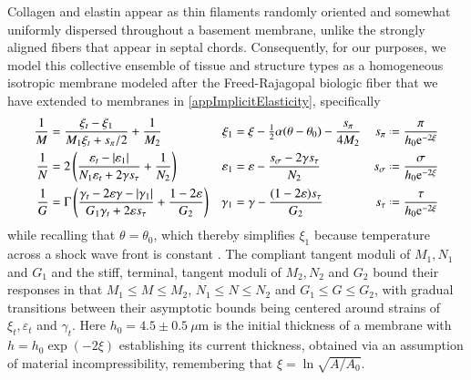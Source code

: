 Collagen and elastin appear as thin filaments randomly oriented and somewhat uniformly dispersed throughout a basement membrane, unlike the strongly aligned fibers that appear in septal chords.  Consequently, for our purposes, we model this collective ensemble of tissue and structure types as a homo\-geneous isotropic membrane modeled after the Freed-Rajagopal biologic fiber \cite{FreedRajagopal16} that we have extended to membranes in \ref{appImplicitElasticity}, specifically
\begin{subequations}
    \label{septalCompliances}
    \begin{align}
    \frac{1}{M} & = \frac{\xi_t - \xi_1}{M_1 \xi_t + s_{\pi} / 2} + \frac{1}{M_2} &
    \xi_1 & = \xi - \tfrac{1}{2} \alpha ( \theta - \theta_0 ) - \frac{s_{\pi}}{4M_2} & s_{\pi} & \defeq \frac{\pi}{h_0 \mathrm{e}^{-2\xi}}
    \label{septalDilationCompliance} \\
    \frac{1}{N} & = 2 \left( \frac{ \varepsilon_t - | \varepsilon_1 |}{N_1 \varepsilon_t + 2 \gamma s_{\tau}} + \frac{1}{N_2} \right) & 
    \varepsilon_1 & = \varepsilon - \frac{s_{\sigma} - 2 \gamma s_{\tau}}{N_2} & s_{\sigma} & \defeq \frac{\sigma}{h_0 \mathrm{e}^{-2\xi}}
    \label{septalSqueezeCompliance} \\
    \frac{1}{G} & = \Gamma \left( \frac{\gamma_t - 2\varepsilon \gamma - | \gamma_1 |}{G_1 \gamma_t + 2 \varepsilon s_{\tau}} + \frac{1-2\varepsilon}{G_2} \right) & 
    \gamma_1 & = \gamma - \frac{(1 - 2\varepsilon) s_{\tau}}{G_2} & s_{\tau} & \defeq \frac{\tau}{h_0 \mathrm{e}^{-2\xi}}
    \label{septalShearCompliance}
    \end{align}
\end{subequations}
while recalling that $\theta = \theta_0$, which thereby simplifies $\xi_1$ because temperature across a shock wave front is constant \cite{AmesStaff53}.  The compliant tangent moduli of $M_1, N_1$ and $G_1$ and the stiff, terminal, tangent moduli of $M_2 , N_2$ and $G_2$ bound their responses in that $M_1 \leq M \leq M_2$, $N_1 \leq N \leq N_2$ and $G_1 \leq G \leq G_2$, with gradual transitions between their asymptotic bounds being centered around strains of $\xi_t , \varepsilon_t$ and $\gamma_t$.    Here $h_0 = 4.5 \pm 0.5\:\mu$m is the initial thickness of a membrane with $h = h_0 \exp (-2\xi)$ establishing its current thickness, obtained via an assumption of material incompressibility, remembering that $\xi = \ln \sqrt{A/A_0}$.

